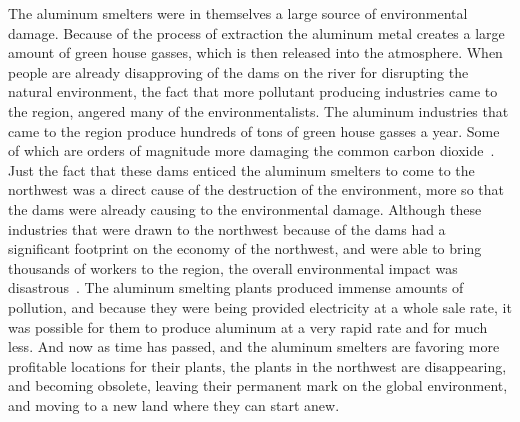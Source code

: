 \documentclass[12pt,twoside]{article}
\begin{document}
The aluminum smelters were in themselves a large source of environmental damage. Because of the process of extraction the aluminum metal creates a large amount of green house gasses, which is then released into the atmosphere. When people are already disapproving of the dams on the river for disrupting the natural environment, the fact that more pollutant producing industries came to the region, angered many of the environmentalists. The aluminum industries that came to the region produce hundreds of tons of green house gasses a year. Some of which are orders of magnitude more damaging the common carbon dioxide~\cite{APA}. Just the fact that these dams enticed the aluminum smelters to come to the northwest was a direct cause of the destruction of the environment, more so that the dams were already causing to the environmental damage. Although these industries that were drawn to the northwest because of the dams had a significant footprint on the economy of the northwest, and were able to bring thousands of workers to the region, the overall environmental impact was disastrous~\cite{OAI}. The aluminum smelting plants produced immense amounts of pollution, and because they were being provided electricity at a whole sale rate, it was possible for them to produce aluminum at a very rapid rate and for much less. And now as time has passed, and the aluminum smelters are favoring more profitable locations for their plants, the plants in the northwest are disappearing, and becoming obsolete, leaving their permanent mark on the global environment, and moving to a new land where they can start anew.
\par
\end{document}
